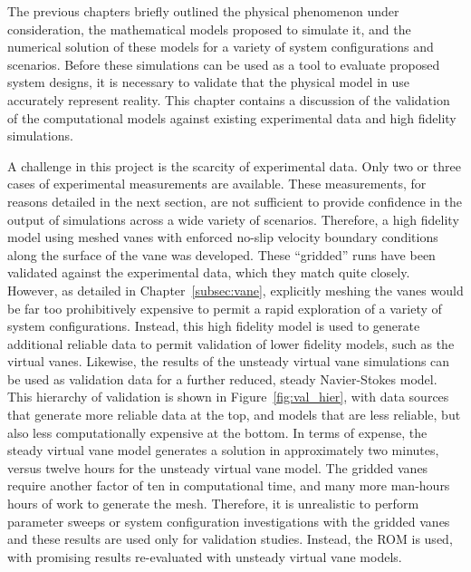
\label{sec:validation}

%
%
%

%
%

The previous chapters briefly outlined the physical phenomenon under
consideration, the mathematical models proposed to simulate it,
and the numerical solution of these models for a variety of system 
configurations and scenarios. Before these simulations can be used 
as a tool to evaluate proposed system designs, it is necessary to
validate that the physical model in use accurately represent
reality. This chapter contains a discussion of the validation of the
computational models against existing experimental data and high
fidelity simulations. 

A challenge in this project is the scarcity of experimental data. Only
two or three cases of experimental measurements are available. These
measurements, for reasons detailed in the next section, are not
sufficient to provide confidence in the output of simulations across a
wide variety  of scenarios. Therefore, a high fidelity model using 
meshed vanes with enforced no-slip velocity boundary conditions along
the surface of the vane was developed. These ``gridded'' runs have
been validated against the experimental data, which they match quite
closely. However, as detailed in Chapter~\ref{subsec:vane}, 
explicitly meshing the vanes would be far too 
prohibitively expensive to permit a rapid exploration of a variety of
system configurations. Instead, this high fidelity model is used 
to generate additional reliable data to permit validation of lower
fidelity models, such as the virtual vanes. Likewise, the results of the
unsteady virtual vane simulations can be used as validation data for a
further reduced, steady Navier-Stokes model. This hierarchy of
validation is shown in Figure~\ref{fig:val_hier}, with data sources that
generate more reliable data at the top, and models that are less
reliable, but also less computationally expensive at the bottom. In
terms of expense, the steady virtual vane model generates a solution in
approximately two minutes, versus twelve hours for the unsteady virtual
vane model. The gridded vanes require another factor of ten in
computational time, and many more man-hours hours of work to generate
the mesh. Therefore, it is unrealistic to perform parameter sweeps or
system configuration investigations with the gridded vanes and these
results are used only for validation studies. Instead, the
ROM is used, with promising results re-evaluated with unsteady virtual
vane models. %

